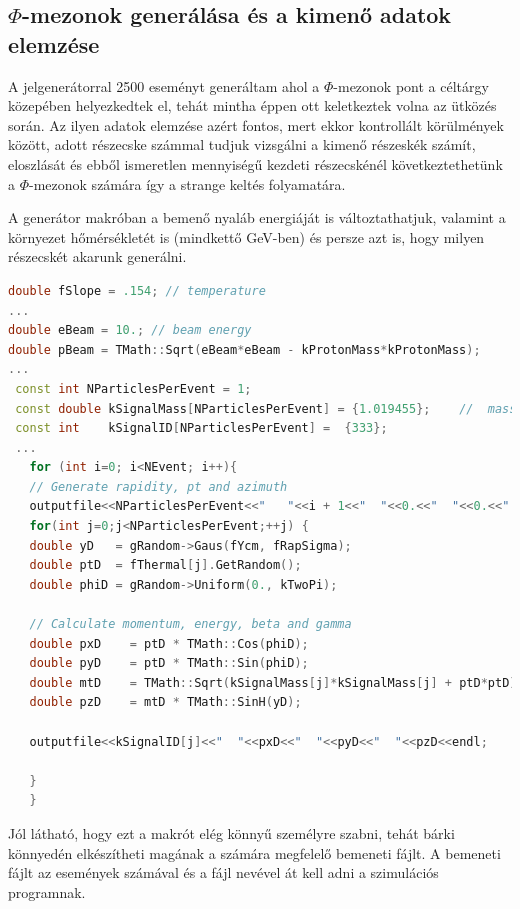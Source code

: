 \documentclass[a4paper,12pt]{article}
\begin{document}
\subsection{ $\Phi$-mezonok generálása és a kimenő adatok elemzése}
\vspace{5mm}
\par A jelgenerátorral 2500 eseményt generáltam ahol a $\Phi$-mezonok pont a céltárgy közepében helyezkedtek el, tehát mintha éppen 
ott keletkeztek volna az ütközés során. Az ilyen adatok elemzése azért fontos, mert ekkor kontrollált körülmények között, adott részecske számmal
tudjuk vizsgálni a kimenő részeskék számít, eloszlását és ebből ismeretlen mennyiségű kezdeti részecskénél következtethetünk a $\Phi$-mezonok számára
így a strange keltés folyamatára. 
\par A generátor makróban a bemenő nyaláb energiáját is változtathatjuk, valamint a környezet hőmérsékletét is (mindkettő GeV-ben) és persze
azt is, hogy milyen részecskét akarunk generálni.
\begin{lstlisting}[language=C++]
double fSlope = .154; // temperature
...
double eBeam = 10.; // beam energy
double pBeam = TMath::Sqrt(eBeam*eBeam - kProtonMass*kProtonMass);
...
 const int NParticlesPerEvent = 1;
 const double kSignalMass[NParticlesPerEvent] = {1.019455};    //  mass in GeV
 const int    kSignalID[NParticlesPerEvent] =  {333};
 ...
   for (int i=0; i<NEvent; i++){
   // Generate rapidity, pt and azimuth
   outputfile<<NParticlesPerEvent<<"   "<<i + 1<<"  "<<0.<<"  "<<0.<<"  "<<0.<<endl;
   for(int j=0;j<NParticlesPerEvent;++j) {      
   double yD   = gRandom->Gaus(fYcm, fRapSigma);
   double ptD  = fThermal[j].GetRandom();
   double phiD = gRandom->Uniform(0., kTwoPi);
   
   // Calculate momentum, energy, beta and gamma
   double pxD    = ptD * TMath::Cos(phiD);
   double pyD    = ptD * TMath::Sin(phiD);
   double mtD    = TMath::Sqrt(kSignalMass[j]*kSignalMass[j] + ptD*ptD);
   double pzD    = mtD * TMath::SinH(yD);
   
   outputfile<<kSignalID[j]<<"  "<<pxD<<"  "<<pyD<<"  "<<pzD<<endl;
   
   }
   }
\end{lstlisting}
\par Jól látható, hogy ezt a makrót elég könnyű személyre szabni, tehát bárki könnyedén elkészítheti magának a számára megfelelő
bemeneti fájlt. A bemeneti fájlt az események számával és a fájl nevével át kell adni a szimulációs programnak.
\end{document}
